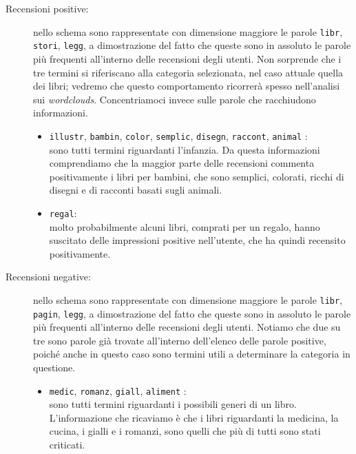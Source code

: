 			\begin{description}
				\item[Recensioni positive:]
				 nello schema sono rappresentate con dimensione maggiore le parole \verb|libr|, \verb|stori|, \verb|legg|, a dimostrazione del fatto che queste sono in assoluto le parole più frequenti all'interno delle recensioni degli utenti. Non sorprende che i tre termini si riferiscano alla categoria selezionata, nel caso attuale quella dei libri; vedremo che questo comportamento ricorrerà spesso nell'analisi sui \textit{wordclouds}. Concentriamoci invece sulle parole che racchiudono informazioni. 	
				\begin{itemize}
					\item \texttt{illustr}, \texttt{bambin}, \texttt{color}, \texttt{semplic},  \texttt{disegn}, \texttt{raccont}, \texttt{animal} : \\
					sono tutti termini riguardanti l'infanzia. Da questa informazioni comprendiamo che la maggior parte delle recensioni commenta positivamente i libri per bambini, che sono semplici, colorati, ricchi di disegni e di racconti basati sugli animali. 
					\item \texttt{regal}: \\
					molto probabilmente alcuni libri, comprati per un regalo, hanno suscitato delle impressioni positive nell'utente, che ha quindi recensito positivamente.
				\end{itemize}	
			
				\item[Recensioni negative:] 
				nello schema sono rappresentate con dimensione maggiore le parole \verb|libr|, \verb|pagin|, \verb|legg|, a dimostrazione del fatto che queste sono in assoluto le parole più frequenti all'interno delle recensioni degli utenti. Notiamo che due su tre sono parole già trovate all'interno dell'elenco delle parole positive, poiché anche in questo caso sono termini utili a determinare la categoria in questione.
				\begin{itemize}
					\item \texttt{medic}, \texttt{romanz}, \texttt{giall}, \texttt{aliment} : \\
					sono tutti termini riguardanti i possibili generi di un libro. L'informazione che ricaviamo è che i libri riguardanti la medicina, la cucina, i gialli e i romanzi, sono quelli che più di tutti sono stati criticati.			
				\end{itemize}
			\end{description}
		
